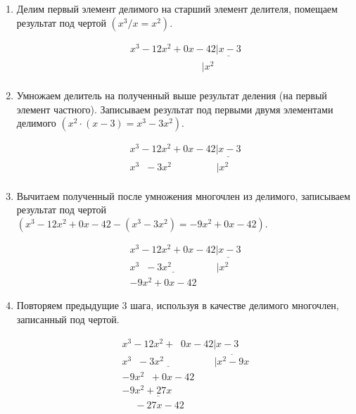 \documentclass[12pt,a4paper]{scrartcl}
\begin{document}
\begin{enumerate}
	
	\item Делим первый элемент делимого на старший элемент делителя, помещаем результат под чертой $\left( x^3 / x = x^2 \right)$.
	
	$$\begin{matrix} x^3 - 12x^2 + 0x - 42 \underline{\vert x-3}\\ \qquad\qquad\qquad\quad\; \vert x^2\\ \end{matrix}$$ 
	
	\item Умножаем делитель на полученный выше результат деления (на первый элемент частного). Записываем результат под первыми двумя элементами делимого $\left( x^2 \cdot \left( x-3 \right) = x^3 - 3x^2 \right)$.
	
	$$\begin{matrix} x^3 - 12x^2 + 0x - 42 \underline{\vert x-3}\\ x^3 \;\; - 3x^2 \qquad\qquad\;\; \vert x^2 \quad\; \\ \end{matrix}$$
	
	\item Вычитаем полученный после умножения многочлен из делимого, записываем результат под чертой $\left( x^3 - 12x^2 + 0x - 42 - \left( x^3 - 3x^2 \right) = - 9x^2 + 0x - 42 \right)$.
	
	$$\begin{matrix} x^3 - 12x^2 + 0x - 42 \underline{\vert x-3}\\ \underline{x^3 \;\; - 3x^2 \qquad\qquad\;\;} \vert x^2 \quad\; \\ - 9x^2 + 0x - 42 \;\; \end{matrix}$$ 
	
	\item Повторяем предыдущие 3 шага, используя в качестве делимого многочлен, записанный под чертой.
	
	$$\begin{matrix} x^3 - 12x^2 + \;\; 0x - 42 \vert x-3 \quad \\ \underline{x^3 \;\; - 3x^2 \qquad\qquad\;\;\;\;} \overline{\vert x^2 - 9x} \\ - 9x^2 \;\; + 0x - 42 \quad\;\; \\ \underline{- 9x^2 + 27x \qquad\;} \quad\;\; \\ \quad\; - 27x - 42 \end{matrix}$$
	

\end{enumerate}
\end{document}
